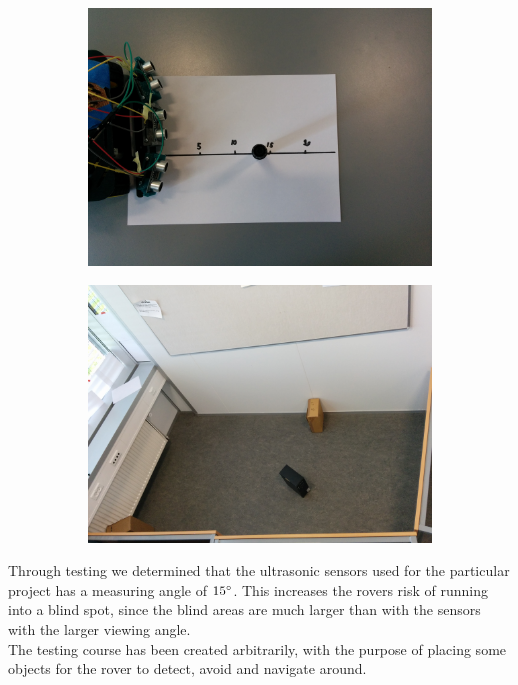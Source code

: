 \begin{figure}[H]
	\centering
	\begin{subfigure}[H]{0.4\textwidth}
		\includegraphics[width=\textwidth]{images/blindspot_test.jpg}
	\end{subfigure}%
	\quad
	\begin{subfigure}[H]{0.4\textwidth}
		\includegraphics[width=\textwidth]{images/testing-course.jpg}
	\end{subfigure}
\end{figure}

Through testing we determined that the ultrasonic sensors used for the particular project has a measuring angle of $15\degree$. This increases the rovers risk of running into a blind spot, since the blind areas are much larger than with the sensors with the larger viewing angle.\\
The testing course has been created arbitrarily, with the purpose of placing some objects for the rover to detect, avoid and navigate around.

